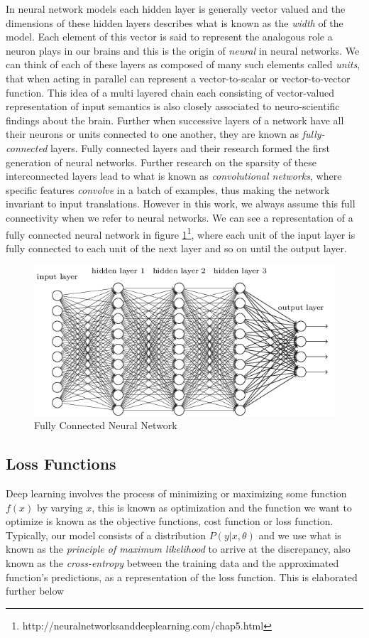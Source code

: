 \documentclass[14pt]{extarticle}
\numberwithin{equation}{section}
\begin{document}
	In neural network models each hidden layer is generally vector valued and the dimensions of these hidden layers describes what is known as the \textit{width} of the model. Each element of this vector is said to represent the analogous role a neuron plays in our brains and this is the origin of \textit{neural} in neural networks. We can think of each of these layers as composed of many such elements called \textit{units}, that when acting in parallel can represent a vector-to-scalar or vector-to-vector function. This idea of a multi layered chain each consisting of vector-valued representation of input semantics is also closely associated to neuro-scientific findings about the brain. Further when successive layers of a network have all their neurons or units connected to one another, they are known as \textit{fully-connected} layers. Fully connected layers and their research formed the first generation of neural networks. Further research on the sparsity of these interconnected layers lead to what is known as \textit{convolutional networks}\cite{LeCun:1998:CNI:303568.303704}, where specific features \textit{convolve} in a batch of examples, thus making the network invariant to input translations. However in this work, we always assume this full connectivity when we refer to neural networks. We can see a representation of a fully connected neural network in figure \ref{nn-fully-connected}\footnote{http://neuralnetworksanddeeplearning.com/chap5.html}, where each unit of the input layer is fully connected to each unit of the next layer and so on until the output layer.
	\begin{figure}[h]
		\vspace{0.2cm}
		\centering
		\includegraphics[scale=0.7]{neuralnetwork}
		\caption{Fully Connected Neural Network
			\label{nn-fully-connected}}
	\end{figure}
	\subsection{Loss Functions}
	Deep learning involves the process of minimizing or maximizing some function $f(x)$ by varying $x$\cite{Goodfellow-et-al-2016}, this is known as optimization and the function we want to optimize is known as the objective functions, cost function or loss function. Typically, our model consists of a distribution $P(y | x, \theta)$ and we use what is known as the \textit{principle of maximum likelihood} to arrive at the discrepancy, also known as the \textit{cross-entropy} between the training data and the approximated function's predictions, as a representation of the loss function. This is elaborated further below
\end{document}
